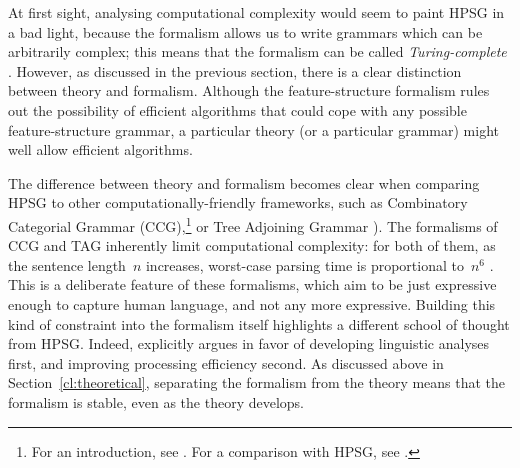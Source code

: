 \documentclass[output=paper,nonflat]{langsci/langscibook}
\begin{document}
At first sight, analysing computational complexity
would seem to paint HPSG in a bad light,
because the formalism allows us to write grammars
which can be arbitrarily complex;
this means that the formalism can be called \textit{Turing-complete}
\citep[Section~3.4]{Johnson88}.
However, as discussed in the previous section,
there is a clear distinction between theory and formalism.
Although the feature-structure formalism rules out the possibility of efficient algorithms
that could cope with any possible feature-structure grammar,
a particular theory (or a particular grammar) might well allow efficient algorithms.

The difference between theory and formalism
becomes clear when comparing HPSG to other computationally-friendly frameworks,
such as Combinatory Categorial Grammar (CCG),\footnote{%
	For an introduction, see \citet{steedman2011ccg}.
	For a comparison with HPSG, see .
}
or Tree Adjoining Grammar \citep[TAG;][]{Joshi87a-u,SAJ88a-u}).
The formalisms of CCG and TAG inherently limit computational complexity:
for both of them, as the sentence length~$n$ increases,
worst-case parsing time is proportional to~$n^6$ \citep{Kasamietal1989}.
This is a deliberate feature of these formalisms,
which aim to be just expressive enough to capture human language,
and not any more expressive.
Building this kind of constraint into the formalism itself
highlights a different school of thought from HPSG.
Indeed, \citet{MuellerCoreGram} explicitly argues
in favor of developing linguistic analyses first,
and improving processing efficiency second.
As discussed above in Section~\ref{cl:theoretical},
separating the formalism from the theory
means that the formalism is stable, even as the theory develops.

\end{document}
